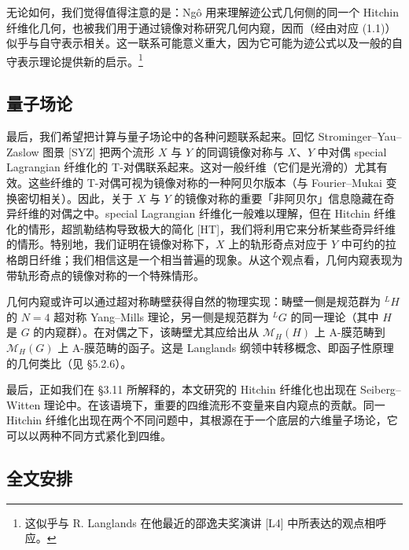 \documentclass[11pt,a4paper]{article}
\begin{document}
无论如何，我们觉得值得注意的是：Ngô 用来理解迹公式几何侧的同一个 Hitchin 纤维化几何，也被我们用于通过镜像对称研究几何内窥，因而（经由对应 (1.1)）似乎与自守表示相关。这一联系可能意义重大，因为它可能为迹公式以及一般的自守表示理论提供新的启示。\footnote{这似乎与 R. Langlands 在他最近的邵逸夫奖演讲 [L4] 中所表达的观点相呼应。}

\subsection{量子场论}

最后，我们希望把计算与量子场论中的各种问题联系起来。回忆 Strominger--Yau--Zaslow 图景 [SYZ] 把两个流形 $X$ 与 $Y$ 的同调镜像对称与 $X$、$Y$ 中对偶 special Lagrangian 纤维化的 T-对偶联系起来。这对一般纤维（它们是光滑的）尤其有效。这些纤维的 T-对偶可视为镜像对称的一种阿贝尔版本（与 Fourier--Mukai 变换密切相关）。因此，关于 $X$ 与 $Y$ 的镜像对称的重要「非阿贝尔」信息隐藏在奇异纤维的对偶之中。special Lagrangian 纤维化一般难以理解，但在 Hitchin 纤维化的情形，超凯勒结构导致极大的简化 [HT]，我们将利用它来分析某些奇异纤维的情形。特别地，我们证明在镜像对称下，$X$ 上的轨形奇点对应于 $Y$ 中可约的拉格朗日纤维；我们相信这是一个相当普遍的现象。从这个观点看，几何内窥表现为带轨形奇点的镜像对称的一个特殊情形。


几何内窥或许可以通过超对称畴壁获得自然的物理实现：畴壁一侧是规范群为 ${}^{L}H$ 的 $N=4$ 超对称 Yang--Mills 理论，另一侧是规范群为 ${}^{L}G$ 的同一理论（其中 $H$ 是 $G$ 的内窥群）。在对偶之下，该畴壁尤其应给出从 $\mathcal{M}_H(H)$ 上 A-膜范畴到 $\mathcal{M}_H(G)$ 上 A-膜范畴的函子。这是 Langlands 纲领中转移概念、即函子性原理的几何类比（见 §5.2.6）。

最后，正如我们在 §3.11 所解释的，本文研究的 Hitchin 纤维化也出现在 Seiberg--Witten 理论中。在该语境下，重要的四维流形不变量来自内窥点的贡献。同一 Hitchin 纤维化出现在两个不同问题中，其根源在于一个底层的六维量子场论，它可以以两种不同方式紧化到四维。

\subsection{全文安排}
\end{document}
